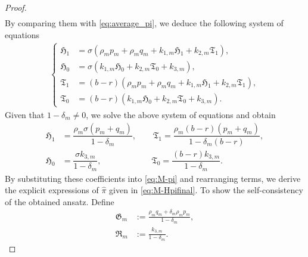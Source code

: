 \documentclass[11pt]{article}
\numberwithin{equation}{section}
\begin{document}
\begin{proof}
\begin{align*}
\end{align*}
By comparing them with \eqref{eq:average_pi}, we deduce the following system of equations
\begin{align}
\begin{cases}
\mathfrak{H}_1&=\sigma\left(\rho_{\scriptscriptstyle m}p_{\scriptscriptstyle m}+\rho_{\scriptscriptstyle m} q_{\scriptscriptstyle m} +k_{1,\scriptscriptstyle m}\mathfrak{H}_1+k_{2,\scriptscriptstyle m}\mathfrak{T}_1\right),\\
\mathfrak{H}_0&=\sigma \left(k_{1,\scriptscriptstyle m}\mathfrak{H}_0+k_{2,\scriptscriptstyle m}\mathfrak{T}_0+k_{3,\scriptscriptstyle m}\right),\\
\mathfrak{T}_1&=(b-r)\left(\rho_{\scriptscriptstyle m}p_{\scriptscriptstyle m}+\rho_{\scriptscriptstyle m} q_{\scriptscriptstyle m} +k_{1,m}\mathfrak{H}_1+k_{2,m}\mathfrak{T}_1\right),\\
\mathfrak{T}_0&=(b-r) \left(k_{1,\scriptscriptstyle m}\mathfrak{H}_0+k_{2,\scriptscriptstyle m}\mathfrak{T}_0+k_{3,m}\right).
\end{cases}
\end{align}
Given that $1-\delta_{\scriptscriptstyle m}\neq 0$, we solve the above system of equations and obtain
	\begin{equation}
		\begin{aligned}
			\mathfrak{H}_1&=\dfrac{\rho_{\scriptscriptstyle m} \sigma (p_{\scriptscriptstyle m}+q_{\scriptscriptstyle m})}{1 - \delta_m},\qquad
			\mathfrak{T}_1=\dfrac{\rho_{\scriptscriptstyle m}(b-r)(p_{\scriptscriptstyle m}+q_{\scriptscriptstyle m})}{1-\delta_m (b-r)},\\
			\mathfrak{H}_0&= \dfrac{\sigma k_{3,\scriptscriptstyle m}}{1-\delta_m}, \qquad \qquad \qquad
			\mathfrak{T}_0=\dfrac{(b-r) k_{3,\scriptscriptstyle m}}{1-\delta_m}.
		\end{aligned}
	\end{equation}
	By substituting these coefficients into \eqref{eq:M-pi} and rearranging terms, we derive the explicit expressions of $\widehat{\pi}$ given in \eqref{eq:M-Hpifinal}.
To show the self-consistency of the obtained ansatz. Define
	\begin{align*}
		\mathfrak{G}_{\scriptscriptstyle m}&:=\frac{\rho_{\scriptscriptstyle m}q_{\scriptscriptstyle m}+\delta_{\scriptscriptstyle m}\rho_{\scriptscriptstyle m} p_{\scriptscriptstyle m}}{1-\delta_{\scriptscriptstyle m}},\\
		\mathfrak{R}_{\scriptscriptstyle m}&:=\frac{k_{3,m}}{1-\delta_{\scriptscriptstyle m}}.
	\end{align*}

\end{proof}
\end{document}
